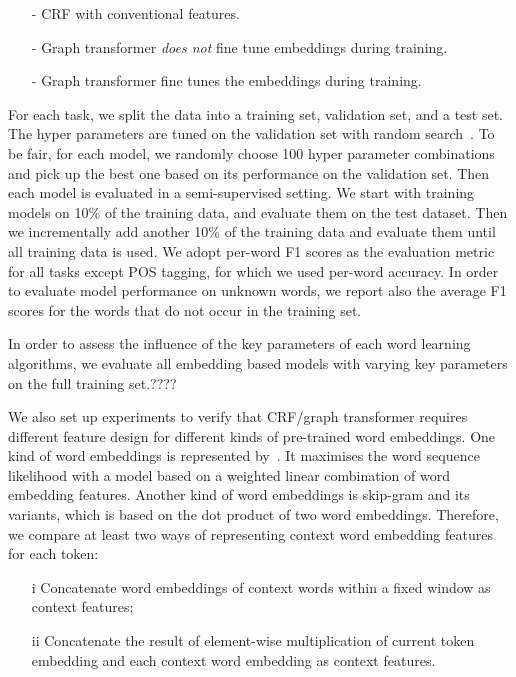 \documentclass[11pt]{article}
\begin{document}
\begin{small}
\begin{itemize}
\item[-] CRF with conventional features.
\item[-] Graph transformer \textit{does not} fine tune embeddings during training.
\item[-] Graph transformer fine tunes the embeddings during training.
\end{itemize}
\end{small}

For each task, we split the data into a training set, validation set, and a test set. The hyper parameters are tuned on the validation set with random search~\cite{bergstra2012random}. To be fair, for each model, we randomly choose 100 hyper parameter combinations and pick up the best one based on its performance on the validation set. Then each model is evaluated in a semi-supervised setting. We start with training models on 10\% of the training data, and evaluate them on the test dataset. Then we incrementally add another 10\% of the training data and evaluate them until all training data is used. We adopt per-word F1 scores as the evaluation metric for all tasks except POS tagging, for which we used per-word accuracy.
In order to evaluate model performance on unknown words, we report also the average F1 scores for the words that do not occur in the training set.

In order to assess the influence of the key parameters of each word learning algorithms, we evaluate all embedding based models with varying key parameters on the full training set.????

We also set up experiments to verify that CRF/graph transformer requires different feature design for different kinds of pre-trained word embeddings. One kind of word embeddings is represented by~\cite{bengio2006neural}. It maximises the word sequence likelihood with a model based on a weighted linear combination of word embedding features. Another kind of word embeddings is skip-gram and its variants, which is based on the dot product of two word embeddings. Therefore, we compare at least two ways of representing context word embedding features for each token:

\begin{small}
\begin{itemize}
\item[i] Concatenate word embeddings of context words within a fixed window as context features; 
\item[ii] Concatenate the result of element-wise multiplication of current token embedding and each context word embedding as context features. 
\end{itemize}
\end{small}
\end{document}
